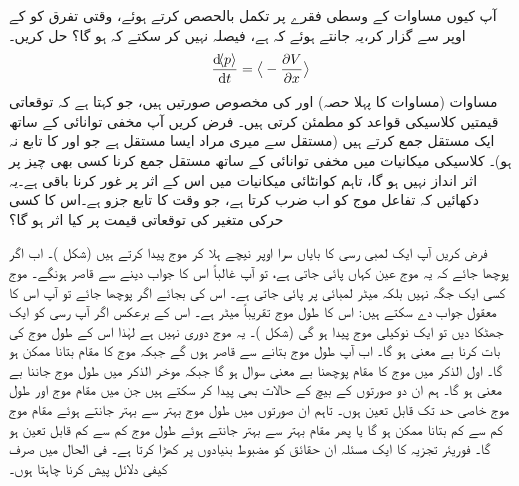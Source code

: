 آپ کیوں مساوات  کے وسطی فقرے پر تکمل بالحصص کرتے ہوئے، وقتی تفرق کو  کے اوپر سے گزار کر،یہ جانتے ہوئے کہ  ہے، فیصلہ نہیں کر سکتے کہ  ہو گا؟
 حل کریں۔
\begin{align}\label{مساوات_تفاعل_موج_مخفی_توانائی_سے_معیار_حرکت}
\frac{\dif\langle p \rangle}{\dif t}=\big\langle-\frac{\partial V}{\partial x} \big\rangle
\end{align}
مساوات  (مساوات  کا پہلا حصہ) اور  
 کی مخصوص صورتیں ہیں، جو کہتا ہے کہ توقعاتی قیمتیں کلاسیکی قواعد کو مطمئن کرتی ہیں۔
فرض کریں آپ مخفی توانائی کے ساتھ ایک مستقل جمع کرتے ہیں (مستقل سے میری مراد ایسا مستقل ہے جو  اور  کا تابع نہ ہو)۔ کلاسیکی میکانیات میں مخفی توانائی کے ساتھ مستقل جمع کرنا کسی بھی چیز پر اثر انداز نہیں ہو گا، تاہم کوانٹائی میکانیات میں اس کے اثر پر غور کرنا باقی ہے۔یہ دکھائیں کہ تفاعل موج کو اب  ضرب کرتا ہے، جو وقت کا تابع جزو ہے۔اس کا کسی حرکی متغیر کی توقعاتی قیمت پر کیا اثر ہو گا؟ 

فرض کریں آپ ایک لمبی رسی کا بایاں سرا اوپر نیچے ہلا کر موج پیدا کرتے ہیں (شکل )۔ اب اگر پوچھا جائے کہ یہ موج عین کہاں پائی جاتی ہے، تو آپ غالباً اس کا جواب دینے سے قاصر ہونگے۔ موج کسی ایک جگہ نہیں بلکہ  میٹر لمبائی پر پائی جاتی ہے۔ اس کی بجائے اگر  پوچھا جائے تو آپ اس کا معقول جواب دے سکتے ہیں: اس کا طول موج تقریباً  میٹر ہے۔ اس کے برعکس اگر آپ رسی کو ایک جھٹکا دیں تو ایک نوکیلی موج پیدا ہو گی
 (شکل )۔ یہ موج دوری نہیں ہے لہٰذا اس کے طول موج کی بات کرنا بے معنی ہو گا۔ اب آپ طول موج بتانے سے قاصر ہوں گے جبکہ موج کا مقام بتانا ممکن ہو گا۔ اول الذکر میں موج کا مقام پوچھنا بے معنی سوال ہو گا جبکہ موخر الذکر میں طول موج جاننا بے معنی ہو گا۔ ہم ان دو صورتوں کے بیچ کے حالات بھی پیدا کر سکتے ہیں جن میں مقام موج اور طول موج خاصی حد تک قابل تعین ہوں۔ تاہم ان صورتوں میں طول موج بہتر سے بہتر جانتے ہوئے مقام موج کم سے کم بتانا ممکن ہو گا یا پھر مقام بہتر سے بہتر جانتے ہوئے طول موج کم سے کم قابل تعین ہو گا۔ فوریئر تجزیہ کا ایک مسئلہ ان حقائق کو مضبوط بنیادوں پر کھڑا کرتا ہے۔ فی الحال میں صرف کیفی دلائل پیش کرنا چاہتا ہوں۔


